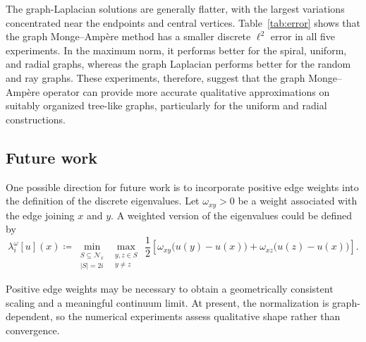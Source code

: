 \documentclass[reqno,11pt]{amsart}
\numberwithin{equation}{section}
\theoremstyle{definition}
\theoremstyle{remark}
\begin{document}
The graph-Laplacian solutions are generally flatter, with the largest
variations concentrated near the endpoints and central vertices.
Table~\ref{tab:error} shows that the graph Monge--Amp\`ere method has
a smaller discrete $\ell^2$ error in all five experiments. In the
maximum norm, it performs better for the spiral, uniform, and radial
graphs, whereas the graph Laplacian performs better for the random
and ray graphs. These experiments, therefore, suggest that the graph
Monge--Amp\`ere operator can provide more accurate qualitative
approximations on suitably organized tree-like graphs, particularly
for the uniform and radial constructions.

\subsection{Future work}

One possible direction for future work is to incorporate positive edge weights into the definition of the discrete eigenvalues. Let \(\omega_{xy}>0\) be a weight associated with the edge joining \(x\)
and \(y\). A weighted version of the eigenvalues could be defined by
\[
    \lambda_i^\omega[u](x)
    \coloneqq
    \min_{\substack{S\subseteq\mathcal N_x\\ |S|=2i}}
    \max_{\substack{y,z\in S\\ y\neq z}} \,
    \frac12 \left[
        \omega_{xy}
        \bigl(u(y)-u(x)\bigr)
        +
        \omega_{xz}
        \bigl(u(z)-u(x)\bigr)
    \right].
\]

Positive edge weights may be necessary to obtain a geometrically consistent scaling and a meaningful continuum limit. At present, the normalization is graph-dependent, so the numerical experiments assess qualitative shape rather than convergence.
\end{document}
